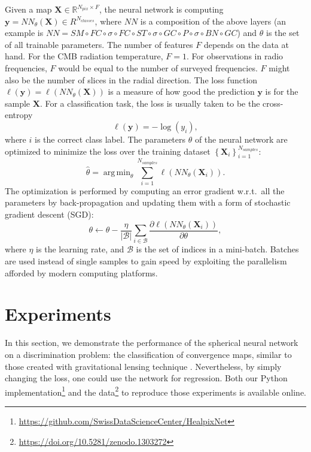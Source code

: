 \documentclass[final,twocolumn,3p,times,authoryear]{elsarticle}
\newcommand{\nati}[1]{{\color[rgb]{.1,.6,.1}{#1}}}
\newcommand{\todo}[1]{{\color[rgb]{.6,.1,.6}{#1}}}
\renewcommand{\b}[1]{{\bm{#1}}}   %
\newcommand{\1}{\b{1}}              %
\newcommand{\0}{\b{0}}              %
\newcommand{\B}{\mathcal{B}}
\newcommand{\X}{\b{X}}
\newcommand{\y}{\b{y}}
\newcommand{\R}{\mathbb{R}}
\DeclareMathOperator*{\argmin}{arg \, min}
\begin{document}
Given a map $\X \in \R^{N_{pix} \times F}$, the neural network is computing $\y = NN_\theta(\X) \in R^{N_{classes}}$, where $NN$ is a composition of the above layers (an example is $NN = SM \circ FC \circ \sigma \circ FC \circ ST \circ \sigma \circ GC \circ P \circ \sigma \circ BN \circ GC$) and $\theta$ is the set of all trainable parameters.
The number of features $F$ depends on the data at hand. For the CMB radiation temperature, $F = 1$. For observations in radio frequencies, $F$ would be equal to the number of surveyed frequencies. $F$ might also be the number of slices in the radial direction.
The loss function $\ell(\y) = \ell(NN_\theta(\X))$ is a measure of how good the prediction $\y$ is for the sample $\X$. For a classification task, the loss is usually taken to be the cross-entropy
\begin{equation*}
	\ell(\y) = -\log(y_i),
\end{equation*}
where $i$ is the correct class label.
The parameters $\theta$ of the neural network are optimized to minimize the loss over the training dataset $\left\{ \X_i \right\}_{i=1}^{N_{samples}}$:
\begin{equation*}
	\hat{\theta} = \argmin_\theta \sum_{i=1}^{N_{samples}} \ell(NN_\theta(\X_i)).
\end{equation*}
The optimization is performed by computing an error gradient w.r.t.\ all the parameters by back-propagation and updating them with a form of stochastic gradient descent (SGD):
\begin{equation*}
	\theta \leftarrow \theta - \frac{\eta}{|\B|} \sum_{i \in \B} \frac{\partial \ell(NN_\theta(\X_i))}{\partial \theta} ,
\end{equation*}
where $\eta$ is the learning rate, and $\B$ is the set of indices in a mini-batch. Batches are used instead of single samples to gain speed by exploiting the parallelism afforded by modern computing platforms.

\nati{4.8 is long... Should we go in such details?}
\todo{Notation GC32 - P256 - FC10 to describe an architecture? Maybe more useful in Experiments where we describe the architecture used for each experiment.}

\section{Experiments}
\label{sec:experiments}

In this section, we demonstrate the performance of the spherical neural network on a discrimination problem: the classification of convergence maps, similar to those created with gravitational lensing technique \citep{chang2017curvedsky}. Nevertheless, by simply changing the loss, one could use the network for regression.
Both our Python implementation\footnote{\url{https://github.com/SwissDataScienceCenter/HealpixNet}} and the data\footnote{\url{https://doi.org/10.5281/zenodo.1303272}} to reproduce those experiments is available online.
\end{document}
